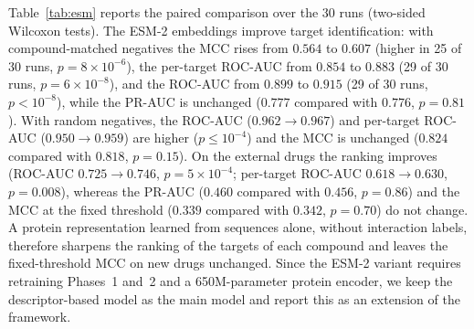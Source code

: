 \documentclass[11pt,letterpaper]{article}
\begin{document}
Table~\ref{tab:esm} reports the paired comparison over the 30 runs (two-sided Wilcoxon tests). The ESM-2 embeddings improve target identification: with compound-matched negatives the MCC rises from $0.564$ to $0.607$ (higher in 25 of 30 runs, $p=8\times10^{-6}$), the per-target ROC-AUC from $0.854$ to $0.883$ (29 of 30 runs, $p=6\times10^{-8}$), and the ROC-AUC from $0.899$ to $0.915$ (29 of 30 runs, $p<10^{-8}$), while the PR-AUC is unchanged ($0.777$ compared with $0.776$, $p=0.81$). With random negatives, the ROC-AUC ($0.962\to0.967$) and per-target ROC-AUC ($0.950\to0.959$) are higher ($p\leq10^{-4}$) and the MCC is unchanged ($0.824$ compared with $0.818$, $p=0.15$). On the external drugs the ranking improves (ROC-AUC $0.725\to0.746$, $p=5\times10^{-4}$; per-target ROC-AUC $0.618\to0.630$, $p=0.008$), whereas the PR-AUC ($0.460$ compared with $0.456$, $p=0.86$) and the MCC at the fixed threshold ($0.339$ compared with $0.342$, $p=0.70$) do not change. A protein representation learned from sequences alone, without interaction labels, therefore sharpens the ranking of the targets of each compound and leaves the fixed-threshold MCC on new drugs unchanged. Since the ESM-2 variant requires retraining Phases~1 and~2 and a 650M-parameter protein encoder, we keep the descriptor-based model as the main model and report this as an extension of the framework.
\end{document}
